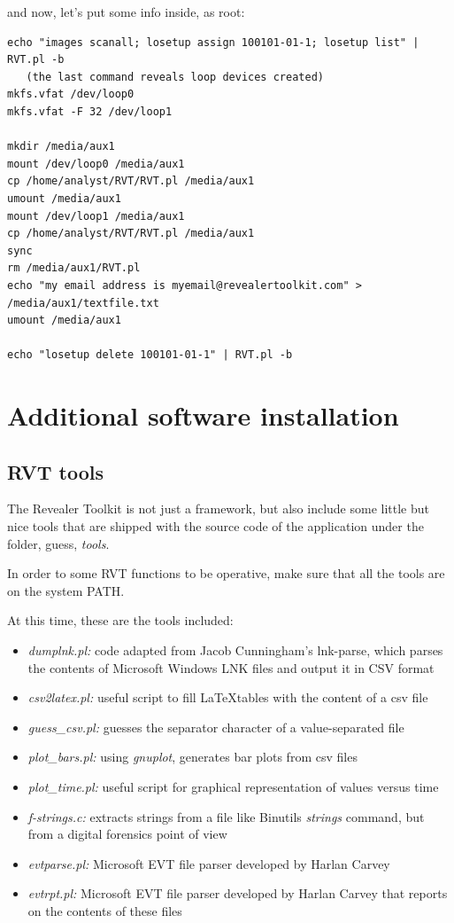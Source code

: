 \documentclass[a4paper,11pt,oneside]{report}
\begin{document}
and now, let's put some info inside, as root:

\begin{verbatim}
echo "images scanall; losetup assign 100101-01-1; losetup list" | RVT.pl -b
   (the last command reveals loop devices created)
mkfs.vfat /dev/loop0
mkfs.vfat -F 32 /dev/loop1   

mkdir /media/aux1
mount /dev/loop0 /media/aux1
cp /home/analyst/RVT/RVT.pl /media/aux1
umount /media/aux1
mount /dev/loop1 /media/aux1
cp /home/analyst/RVT/RVT.pl /media/aux1
sync
rm /media/aux1/RVT.pl
echo "my email address is myemail@revealertoolkit.com" > /media/aux1/textfile.txt
umount /media/aux1

echo "losetup delete 100101-01-1" | RVT.pl -b
\end{verbatim}




\chapter{Additional software installation}

\section{RVT tools} \label{anx:rvttools}

The Revealer Toolkit is not just a framework, but also include some little but nice tools that are shipped with the source code of the application under the folder, guess, \emph{tools}. 

In order to some RVT functions to be operative, make sure that all the tools are on the system PATH.

At this time, these are the tools included:

\begin{itemize}
\item \emph{dumplnk.pl:} code adapted from Jacob Cunningham's lnk-parse, which parses the contents of Microsoft Windows LNK files and output it in CSV format
\item \emph{csv2latex.pl:} useful script to fill \LaTeX tables with the content of a csv file
\item \emph{guess\_csv.pl:} guesses the separator character of a value-separated file
\item \emph{plot\_bars.pl:} using \emph{gnuplot}, generates bar plots from csv files
\item \emph{plot\_time.pl:} useful script for graphical representation of values versus time
\item \emph{f-strings.c:} extracts strings from a file like Binutils \emph{strings}  command, but from a digital forensics point of view
\item \emph{evtparse.pl:} Microsoft EVT file parser developed by Harlan Carvey
\item \emph{evtrpt.pl:} Microsoft EVT file parser developed by Harlan Carvey that reports on the contents of these files
\end{itemize}
\end{document}

